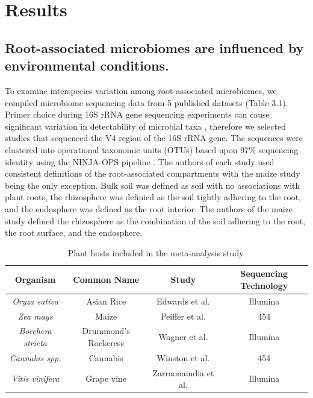 \section{Results}
\subsection{Root-associated microbiomes are influenced by environmental conditions.}
To examine interspecies variation among root-associated microbiomes, we compiled microbiome sequencing data from 5 published datasets (Table 3.1). Primer choice during 16S rRNA gene sequencing experiments can cause significant variation in detectability of microbial taxa \cite{Debelius2016}, therefore we selected studies that sequenced the V4 region of the 16S rRNA gene. The sequences were clustered into operational taxonomic units (OTUs) based upon 97\% sequencing identity using the NINJA-OPS pipeline \cite{Al-Ghalith2016}. The authors of each study used consistent definitions of the root-associated compartments with the maize study being the only exception. Bulk soil was defined as soil with no associations with plant roots, the rhizosphere was definied as the soil tightly adhering to the root, and the endosphere was defined as the root interior. The authors of the maize study defined the rhizosphere as the combination of the soil adhering to the root, the root surface, and the endosphere.

\begin{table}[ht]
\centering
\small
{}
\caption[Table 3.1]{Plant hosts included in the meta-analysis study.}
\begin{tabular}{c|ccc}
\hline
\textbf{Organism}& \textbf{Common Name} & \textbf{Study} & \textbf{Sequencing Technology} \\
\hline
\rowcolor{Gray}
\textit{Oryza sativa}& Asian Rice & Edwards et al. \cite{Edwards2015} & Illumina \\
\textit{Zea mays}& Maize & Peiffer et al. \cite{Peiffer2013} & 454 \\
\rowcolor{Gray}
\textit{Boechera stricta}& Drummond's Rockcress & Wagner et al. \cite{Wagner2016} & Illumina \\
\textit{Cannabis spp.}& Cannabis & Winston et al. \cite{Winston2014} & 454 \\
\rowcolor{Gray}
\textit{Vitis vinifera}& Grape vine & Zarraonaindia et al. \cite{Zarraonaindia2015} & Illumina \\
\hline
\end{tabular}
\end{table}

